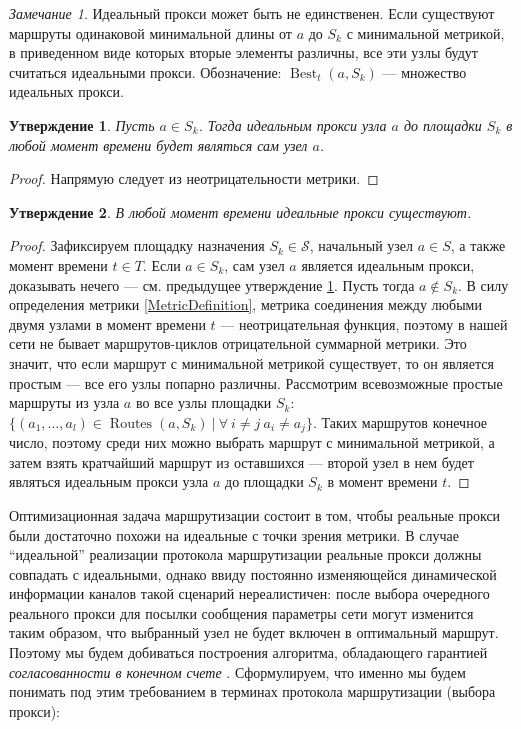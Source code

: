 \documentclass{article}
\theoremstyle{plain}
\theoremstyle{plain}
\theoremstyle{plain}
\theoremstyle{plain}
\newtheorem{claim}{Утверждение}[section]
\theoremstyle{definition}
\theoremstyle{remark}
\newtheorem{remark}{Замечание}[section]
\theoremstyle{plain}
\DeclareMathOperator*{\best}{Best}
\DeclareMathOperator*{\routes}{Routes}
\begin{document}
\begin{remark}
    Идеальный прокси может быть не единственен. Если существуют маршруты одинаковой минимальной длины от $a$ до $S_k$ с минимальной метрикой, в приведенном виде которых вторые элементы различны, все эти узлы будут считаться идеальными прокси. Обозначение: $\best_t(a, S_k)$ --- множество идеальных прокси.
\end{remark}

\begin{claim}
\label{SelfProxy}
    Пусть $a \in S_k$. Тогда идеальным прокси узла $a$ до площадки $S_k$ в любой момент времени будет являться сам узел $a$.
\end{claim}
\begin{proof}
    Напрямую следует из неотрицательности метрики.
\end{proof}

\begin{claim}
\label{IdealProxyExistance}
    В любой момент времени идеальные прокси существуют.
\end{claim}
\begin{proof}
    Зафиксируем площадку назначения $S_k \in \mathcal{S}$, начальный узел $a \in S$, а также момент времени $t \in T$. Если $a \in S_k$, сам узел $a$ является идеальным прокси, доказывать нечего --- см. предыдущее утверждение \ref{SelfProxy}. Пусть тогда $a \notin S_k$. В силу определения метрики \ref{MetricDefinition}, метрика соединения между любыми двумя узлами в момент времени $t$ --- неотрицательная функция, поэтому в нашей сети не бывает маршрутов-циклов отрицательной суммарной метрики. Это значит, что если маршрут с минимальной метрикой существует, то он является простым --- все его узлы попарно различны. Рассмотрим всевозможные простые маршруты из узла $a$ во все узлы площадки $S_k$: $\{(a_1, \ldots, a_l) \in \routes(a, S_k)\ |\ \forall\ i \neq j\ a_i \neq a_j\}$. Таких маршрутов конечное число, поэтому среди них можно выбрать маршрут с минимальной метрикой, а затем взять кратчайший маршрут из оставшихся --- второй узел в нем будет являться идеальным прокси узла $a$ до площадки $S_k$ в момент времени $t$.
\end{proof}

Оптимизационная задача маршрутизации состоит в том, чтобы реальные прокси были достаточно похожи на идеальные с точки зрения метрики. В случае \enquote{идеальной} реализации протокола маршрутизации реальные прокси должны совпадать с идеальными, однако ввиду постоянно изменяющейся динамической информации каналов такой сценарий нереалистичен: после выбора очередного реального прокси для посылки сообщения параметры сети могут изменится таким образом, что выбранный узел не будет включен в оптимальный маршрут. Поэтому мы будем добиваться построения алгоритма, обладающего гарантией \textit{согласованности в конечном счете} \cite{eventual_consistency:10.1145/1435417.1435432}. Сформулируем, что именно мы будем понимать под этим требованием в терминах протокола маршрутизации (выбора прокси):
\end{document}
